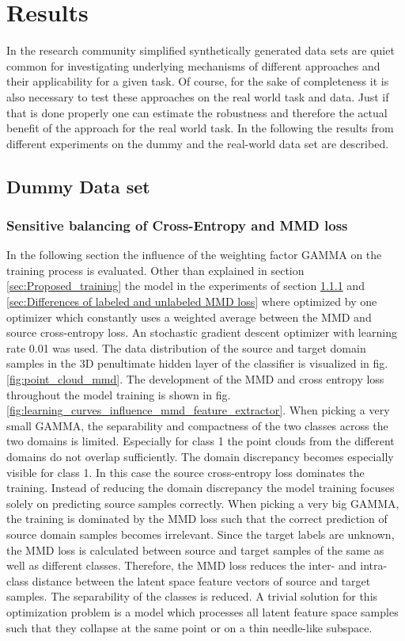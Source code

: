 \chapter{Results}\label{chapter:results}
In the research community simplified synthetically generated data sets are quiet common for investigating underlying mechanisms of different approaches and their applicability for a given task. Of course, for the sake of completeness it is also necessary to test these approaches on the real world task and data. Just if that is done properly one can estimate the robustness and therefore the actual benefit of the approach for the real world task. In the following the results from different experiments on the dummy and the real-world data set are described.

\section{Dummy Data set}
\subsection{Sensitive balancing of Cross-Entropy and MMD loss} \label{sec:Balancing Cross-Entropy and MMD loss}

In the following section the influence of the weighting factor GAMMA on the training process is evaluated. Other than explained in section \ref{sec:Proposed_training} the model in the experiments of section \ref{sec:Balancing Cross-Entropy and MMD loss} and \ref{sec:Differences of labeled and unlabeled MMD loss} where optimized by one optimizer which constantly uses a weighted average between the MMD and source cross-entropy loss. An stochastic gradient descent optimizer with learning rate 0.01 was used. The data distribution of the source and target domain samples in the 3D penultimate hidden layer of the classifier is visualized in fig. \ref{fig:point_cloud_mmd}. The development of the MMD and cross entropy loss throughout the model training is shown in fig. \ref{fig:learning_curves_influence_mmd_feature_extractor}. When picking a very small GAMMA, the separability and compactness of the two classes across the two domains is limited. Especially for class 1 the point clouds from the different domains do not overlap sufficiently. The domain discrepancy becomes especially visible for class 1. In this case the source cross-entropy loss dominates the training. Instead of reducing the domain discrepancy the model training focuses solely on predicting source samples correctly. When picking a very big GAMMA, the training is dominated by the MMD loss such that the correct prediction of source domain samples becomes irrelevant. Since the target labels are unknown, the MMD loss is calculated between source and target samples of the same as well as different classes. Therefore, the MMD loss reduces the inter- and intra-class distance between the latent space feature vectors of source and target samples. The separability of the classes is reduced. A trivial solution for this optimization problem is a model which processes all latent feature space samples such that they collapse at the same point or on a thin needle-like subspace.

